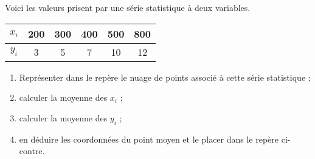 \documentclass[11pt]{article}
\begin{document}
\begin{exercice}
\begin{multicols}{2}

Voici les valeurs prisent par une série statistique à deux variables.

\begin{center}
\begin{tabular}{|c|c|c|c|c|c|}
\hline
$x_i$ & 200 & 300 & 400 & 500 & 800 \\
\hline
$y_i$ & 3 & 5 & 7 & 10 & 12 \\
\hline
\end{tabular}
\end{center}

\begin{enumerate}
\item Représenter dans le repère le nuage de points associé à cette série
statistique ;
\item calculer la moyenne des $x_i$ ;
\item calculer la moyenne des $y_i$ ;
\item en déduire les coordonnées du point moyen et le placer dans le
repère ci-contre.
\end{enumerate}

\columnbreak

\begin{center}
\end{center}
\end{multicols}

\end{exercice}
\end{document}
